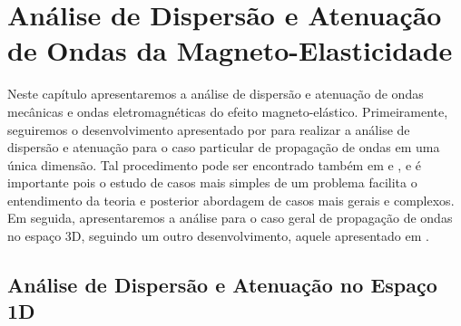 \chapter{An\'alise de Dispers\~ao e Atenua\c{c}\~ao de Ondas da Magneto-Elasticidade}

Neste cap\'itulo apresentaremos a an\'alise de dispers\~ao e atenua\c{c}\~ao de ondas mec\^anicas e ondas eletromagn\'eticas do efeito magneto-el\'astico. Primeiramente, seguiremos o desenvolvimento apresentado por \cite{Blanc_13} para realizar a an\'alise de dispers\~ao e atenua\c{c}\~ao para o caso particular de propaga\c{c}\~ao de ondas em uma \'unica dimens\~ao. Tal procedimento pode ser encontrado tamb\'em em \cite{oliveira_2018} e \cite{miranda_2016}, e \'e importante pois o estudo de casos mais simples de um problema facilita o entendimento da teoria e posterior abordagem de casos mais gerais e complexos. Em seguida, apresentaremos a an\'alise para o caso geral de propaga\c{c}\~ao de ondas no espa\c{c}o 3D, seguindo um outro desenvolvimento, aquele apresentado em \cite{sharma_08}.

\section{An\'alise de Dispers\~ao e Atenua\c{c}\~ao no Espa\c{c}o 1D}

